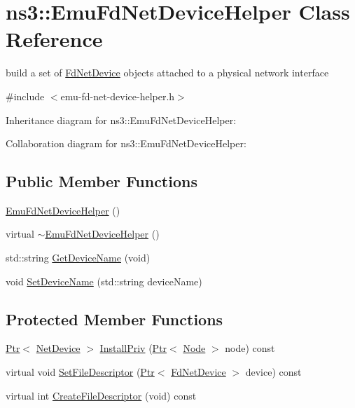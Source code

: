 \hypertarget{classns3_1_1EmuFdNetDeviceHelper}{}\section{ns3\+:\+:Emu\+Fd\+Net\+Device\+Helper Class Reference}
\label{classns3_1_1EmuFdNetDeviceHelper}


build a set of \hyperlink{classns3_1_1FdNetDevice}{Fd\+Net\+Device} objects attached to a physical network interface  




{\ttfamily \#include $<$emu-\/fd-\/net-\/device-\/helper.\+h$>$}



Inheritance diagram for ns3\+:\+:Emu\+Fd\+Net\+Device\+Helper\+:


Collaboration diagram for ns3\+:\+:Emu\+Fd\+Net\+Device\+Helper\+:
\subsection*{Public Member Functions}
\begin{DoxyCompactItemize}
\item 
\hyperlink{classns3_1_1EmuFdNetDeviceHelper_ae4f56369d0efcfe57883ccb2fac50505}{Emu\+Fd\+Net\+Device\+Helper} ()
\item 
virtual \hyperlink{classns3_1_1EmuFdNetDeviceHelper_a0599b6cc5450eb0d950da3bcfabdce4d}{$\sim$\+Emu\+Fd\+Net\+Device\+Helper} ()
\item 
std\+::string \hyperlink{classns3_1_1EmuFdNetDeviceHelper_a12d7886e84be06c4c5021ad92584bb2b}{Get\+Device\+Name} (void)
\item 
void \hyperlink{classns3_1_1EmuFdNetDeviceHelper_aa5c26a78442e507ba969f28ffa5f748e}{Set\+Device\+Name} (std\+::string device\+Name)
\end{DoxyCompactItemize}
\subsection*{Protected Member Functions}
\begin{DoxyCompactItemize}
\item 
\hyperlink{classns3_1_1Ptr}{Ptr}$<$ \hyperlink{classns3_1_1NetDevice}{Net\+Device} $>$ \hyperlink{classns3_1_1EmuFdNetDeviceHelper_a80562da33cef1c20d4b03b351fbbc21a}{Install\+Priv} (\hyperlink{classns3_1_1Ptr}{Ptr}$<$ \hyperlink{classns3_1_1Node}{Node} $>$ node) const 
\item 
virtual void \hyperlink{classns3_1_1EmuFdNetDeviceHelper_ad48e0e01cd07bd76bdc6bf05ed4fa756}{Set\+File\+Descriptor} (\hyperlink{classns3_1_1Ptr}{Ptr}$<$ \hyperlink{classns3_1_1FdNetDevice}{Fd\+Net\+Device} $>$ device) const 
\item 
virtual int \hyperlink{classns3_1_1EmuFdNetDeviceHelper_a64392b0acfeddf0121b251bc7e6e8906}{Create\+File\+Descriptor} (void) const 
\end{DoxyCompactItemize}
